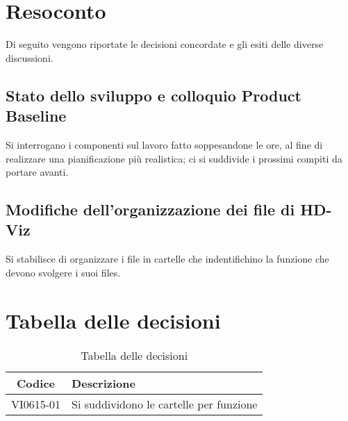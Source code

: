 \documentclass{article}
\begin{document}
\newpage
\section{Resoconto}
\label{sec:resoconto}

Di seguito vengono riportate le decisioni concordate e gli esiti delle diverse discussioni.

\subsection{Stato dello sviluppo e colloquio Product Baseline}
\label{itm:1}
Si interrogano i componenti sul lavoro fatto soppesandone le ore, al fine di realizzare una pianificazione più realistica;
ci si suddivide i prossimi compiti da portare avanti.

\subsection{Modifiche dell'organizzazione dei file di HD-Viz}
\label{itm:2}
Si stabilisce di organizzare i file in cartelle che indentifichino la funzione che devono svolgere i suoi files.


\section{Tabella delle decisioni}%
\label{sub:decisioni}

\begin{table}[!ht]
	\centering
	\begin{tabular}{|c|p{13cm}|}
		\hline
		\rowcolor{lightgray}
		\textbf{Codice} & \textbf{Descrizione} \\
		\hline
			VI0615-01 & Si suddividono le cartelle per funzione \\

		\hline
	\end{tabular}
	\caption{Tabella delle decisioni}
\end{table}
\end{document}
